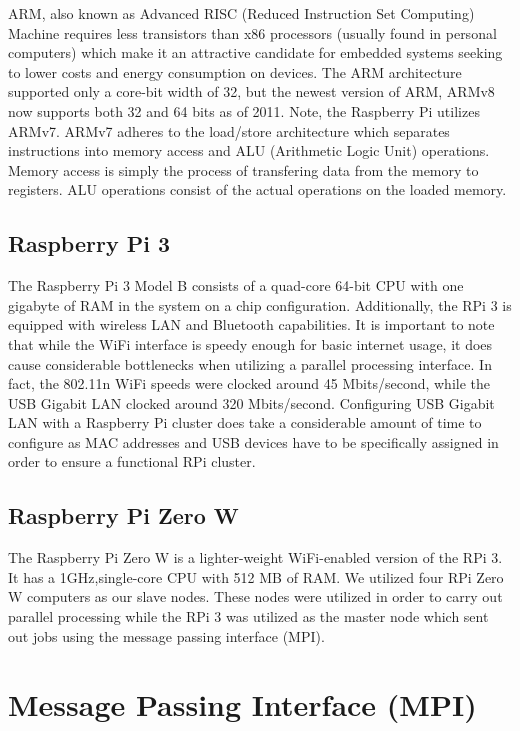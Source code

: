 	ARM, also known as Advanced RISC (Reduced Instruction Set Computing) Machine requires less transistors than x86 processors (usually found in personal computers) which make it an attractive candidate for embedded systems seeking to lower costs and energy consumption on devices. The ARM architecture supported only a core-bit width of 32, but the newest version of ARM, ARMv8 now supports both 32 and 64 bits as of 2011. Note, the Raspberry Pi utilizes ARMv7. ARMv7 adheres to the load/store architecture which separates instructions into memory access and ALU (Arithmetic Logic Unit) operations. Memory access is simply the process of transfering data from the memory to registers. ALU operations consist of the actual operations on the loaded memory. 

\subsection{Raspberry Pi 3}
	The Raspberry Pi 3 Model B consists of a quad-core 64-bit CPU with one gigabyte of RAM in the system on a chip configuration. Additionally, the RPi 3 is equipped with wireless LAN and Bluetooth capabilities. It is important to note that while the WiFi interface is speedy enough for basic internet usage, it does cause considerable bottlenecks when utilizing a parallel processing interface. In fact, the 802.11n WiFi speeds were clocked around 45 Mbits/second, while the USB Gigabit LAN clocked around 320 Mbits/second. Configuring USB Gigabit LAN with a Raspberry Pi cluster does take a considerable amount of time to configure as MAC addresses and USB devices have to be specifically assigned in order to ensure a functional RPi cluster. 

\subsection{Raspberry Pi Zero W}
	The Raspberry Pi Zero W is a lighter-weight WiFi-enabled version of the RPi 3. It has a 1GHz,single-core CPU with 512 MB of RAM. We utilized four RPi Zero W computers as our slave nodes. These nodes were utilized in order to carry out parallel processing while the RPi 3 was utilized as the master node which sent out jobs using the message passing interface (MPI). 


\section{Message Passing Interface (MPI)}

